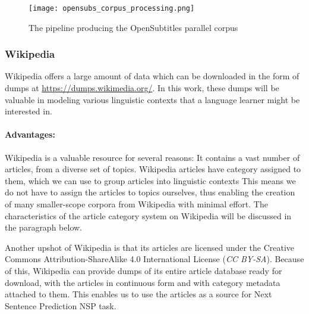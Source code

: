 \begin{figure}[H]
	\centering
	\texttt{[image: opensubs\_corpus\_processing.png]}
	\caption{The pipeline producing the OpenSubtitles parallel corpus}
	\label{fig:opensubs pipeline}
\end{figure}

\subsubsection{Wikipedia}

Wikipedia offers a large amount of data which can be downloaded in the form of dumps at \url{https://dumps.wikimedia.org/}.
In this work, these dumps will be valuable in modeling various linguistic contexts that a language learner might be interested in.

\paragraph{Advantages:}

Wikipedia is a valuable resource for several reasons:
It contains a vast number of articles, from a diverse set of topics.
Wikipedia articles have category assigned to them, which we can use to group articles into linguistic contexts
This means we do not have to assign the articles to topics ourselves, thus enabling the creation of many smaller-scope corpora from Wikipedia with minimal effort.
The characteristics of the article category system on Wikipedia will be discussed in the paragraph below.

Another upshot of Wikipedia is that its articles are licensed under the Creative Commons Attribution-ShareAlike 4.0 International License (\textit{CC BY-SA}).
Because of this, Wikipedia can provide dumps of its entire article database ready for download, with the articles in continuous form and with category metadata attached to them.
This enables us to use the articles as a source for Next Sentence Prediction NSP task.

